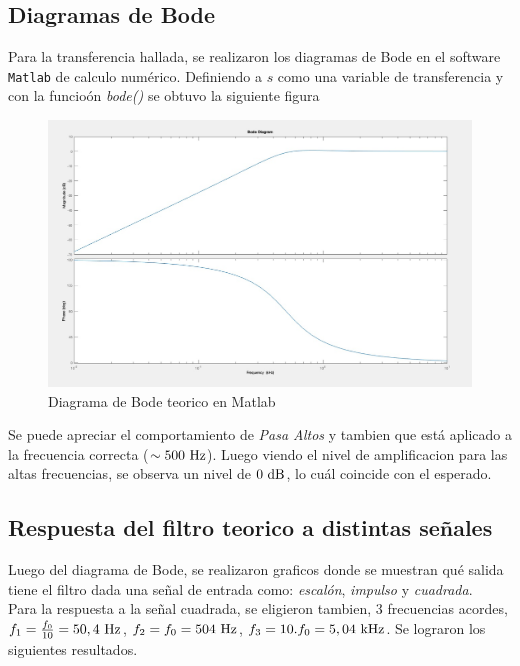\subsection*{Diagramas de Bode}
Para la transferencia hallada, se realizaron los diagramas de Bode en el software \texttt{Matlab} de calculo num\'erico. Definiendo a $s$  como una variable de transferencia y con la funcio\'on \textit{bode()} se obtuvo la siguiente figura\\
\begin{figure}[h]
	\centering
	\includegraphics[width=18cm]{imagenes/BODE.jpg}	\caption{Diagrama de Bode teorico en Matlab}
\end{figure}

Se puede apreciar el comportamiento de \textit{Pasa Altos} y tambien que est\'a aplicado a la frecuencia correcta ($\sim 500\ \si{\hertz}$). Luego viendo el nivel de amplificacion para las altas frecuencias, se observa un nivel de $0 \dB$, lo cu\'al coincide con el esperado.

\subsection*{Respuesta del filtro teorico a distintas señales}

Luego del diagrama de Bode, se realizaron graficos donde se muestran qu\'e salida tiene el filtro dada una señal de entrada como: \textit{escal\'on}, \textit{impulso} y \textit{cuadrada}.\\

Para la respuesta a la señal cuadrada, se eligieron tambien,  3 frecuencias acordes, $f_1 = \frac{f_0}{10}=50,4 \ \si{\hertz}$, $f_2 = f_0 = 504\ \si{\hertz}$, $f_3 = 10.f_0= 5,04 \ \si{\kilo\hertz}$.
Se lograron los siguientes resultados.\\

